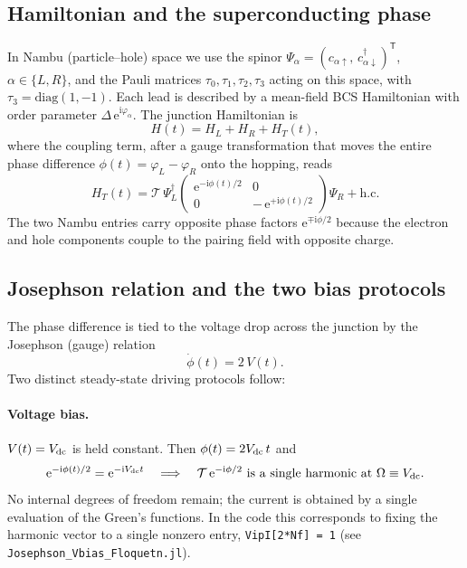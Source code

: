 \documentclass[11pt,a4paper]{article}
\newcommand{\ii}{\mathrm{i}}
\newcommand{\ee}{\mathrm{e}}
\newcommand{\tauz}{\tau_3}
\newcommand{\Om}{\Omega}
\begin{document}
\subsection{Hamiltonian and the superconducting phase}

In Nambu (particle--hole) space we use the spinor
$\Psi_\alpha=(c_{\alpha\uparrow},\,c^\dagger_{\alpha\downarrow})^{\mathsf T}$,
$\alpha\in\{L,R\}$, and the Pauli matrices $\tau_0,\tau_1,\tau_2,\tau_3$ acting
on this space, with $\tauz=\mathrm{diag}(1,-1)$.  Each lead is described by a
mean-field BCS Hamiltonian with order parameter $\Delta\,\ee^{\ii\varphi_\alpha}$.
The junction Hamiltonian is
\begin{equation}
  H(t) = H_L + H_R + H_T(t),
\end{equation}
where the coupling term, after a gauge transformation that moves the entire
phase difference $\phi(t)=\varphi_L-\varphi_R$ onto the hopping, reads
\begin{equation}
  H_T(t) = \mathcal{T}\,
  \Psi_L^\dagger
  \begin{pmatrix}
     \ee^{-\ii\phi(t)/2} & 0\\[2pt]
     0 & -\,\ee^{+\ii\phi(t)/2}
  \end{pmatrix}
  \Psi_R + \text{h.c.}
  \label{eq:HT}
\end{equation}
The two Nambu entries carry opposite phase factors $\ee^{\mp\ii\phi/2}$ because
the electron and hole components couple to the pairing field with opposite
charge.

\subsection{Josephson relation and the two bias protocols}
\label{sec:bias}

The phase difference is tied to the voltage drop across the junction by the
Josephson (gauge) relation
\begin{equation}
  \dot\phi(t) = 2\,V(t).
  \label{eq:josephson}
\end{equation}
Two distinct steady-state driving protocols follow:

\paragraph{Voltage bias.}
$V(t)=V_{\rm dc}$ is held constant.  Then $\phi(t)=2V_{\rm dc}\,t$ and
\begin{equation}
  \ee^{-\ii\phi(t)/2} = \ee^{-\ii V_{\rm dc} t}
  \quad\Longrightarrow\quad
  \mathcal{T}\,\ee^{-\ii\phi/2}\ \text{is a single harmonic at}\ \Om\equiv V_{\rm dc}.
  \label{eq:vbias_phase}
\end{equation}
No internal degrees of freedom remain; the current is obtained by a single
evaluation of the Green's functions.  In the code this corresponds to fixing
the harmonic vector to a single nonzero entry,
\verb|VipI[2*Nf] = 1| (see \texttt{Josephson\_Vbias\_Floquetn.jl}).
\end{document}
